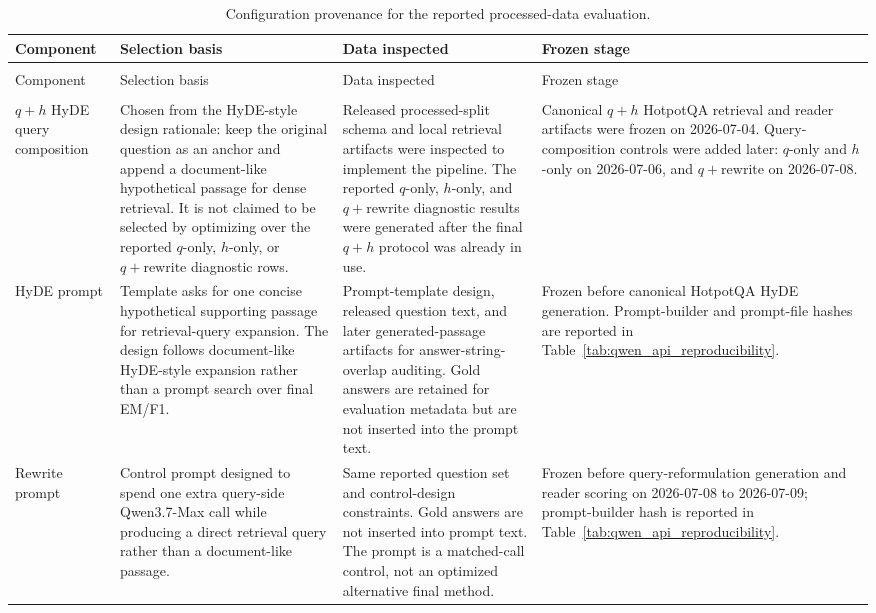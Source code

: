 \begingroup
\footnotesize
\setlength{\tabcolsep}{2pt}
\renewcommand{\arraystretch}{1.02}
\begin{longtable}{>{\raggedright\arraybackslash}p{}
                            >{\raggedright\arraybackslash}p{}
                            >{\raggedright\arraybackslash}p{}
                            >{\raggedright\arraybackslash}p{}}
\caption{Configuration provenance for the reported processed-data evaluation.}
\label{tab:configuration_provenance}\\
\toprule
Component & Selection basis & Data inspected & Frozen stage \\
\midrule
\endfirsthead
\multicolumn{4}{l}{\footnotesize\itshape Table~\thetable\ continued}\\
\toprule
Component & Selection basis & Data inspected & Frozen stage \\
\midrule
\endhead
\midrule
\multicolumn{4}{r}{\footnotesize Continued on next page}\\
\endfoot
\bottomrule
\endlastfoot
$q+h$ HyDE query composition & Chosen from the HyDE-style design rationale: keep the original question as an anchor and append a document-like hypothetical passage for dense retrieval. It is not claimed to be selected by optimizing over the reported $q$-only, $h$-only, or $q+\mathrm{rewrite}$ diagnostic rows. & Released processed-split schema and local retrieval artifacts were inspected to implement the pipeline. The reported $q$-only, $h$-only, and $q+\mathrm{rewrite}$ diagnostic results were generated after the final $q+h$ protocol was already in use. & Canonical $q+h$ HotpotQA retrieval and reader artifacts were frozen on 2026-07-04. Query-composition controls were added later: $q$-only and $h$-only on 2026-07-06, and $q+\mathrm{rewrite}$ on 2026-07-08. \\
HyDE prompt & Template asks for one concise hypothetical supporting passage for retrieval-query expansion. The design follows document-like HyDE-style expansion rather than a prompt search over final EM/F1. & Prompt-template design, released question text, and later generated-passage artifacts for answer-string-overlap auditing. Gold answers are retained for evaluation metadata but are not inserted into the prompt text. & Frozen before canonical HotpotQA HyDE generation. Prompt-builder and prompt-file hashes are reported in Table~\ref{tab:qwen_api_reproducibility}. \\
Rewrite prompt & Control prompt designed to spend one extra query-side Qwen3.7-Max call while producing a direct retrieval query rather than a document-like passage. & Same reported question set and control-design constraints. Gold answers are not inserted into prompt text. The prompt is a matched-call control, not an optimized alternative final method. & Frozen before query-reformulation generation and reader scoring on 2026-07-08 to 2026-07-09; prompt-builder hash is reported in Table~\ref{tab:qwen_api_reproducibility}. \\

\end{longtable}
